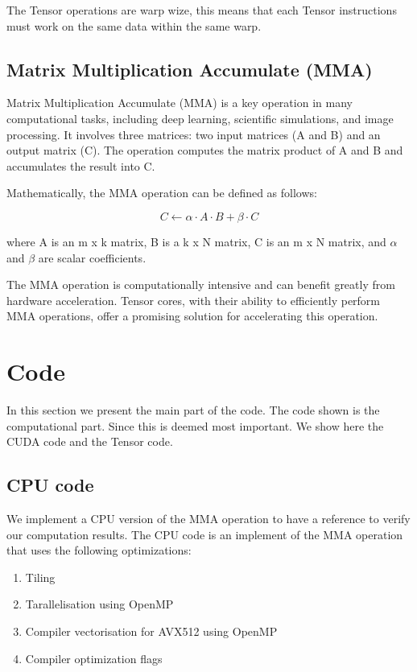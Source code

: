 \documentclass[conference]{IEEEtran}
\begin{document}
  The Tensor operations are warp wize, this means that each Tensor instructions must work on the same 
  data within the same warp.
  
  \subsection{Matrix Multiplication Accumulate (MMA)}\label{sec:mma}
  
  Matrix Multiplication Accumulate (MMA) is a key operation in many computational tasks, including deep 
  learning, scientific simulations, and image processing. It involves three matrices: two input matrices 
  (A and B) and an output matrix (C). The operation computes the matrix product of A and B and accumulates 
  the result into C.
  
  Mathematically, the MMA operation can be defined as follows:
  
  \[ C \leftarrow \alpha \cdot A \cdot B + \beta \cdot C \]
  
  where A is an m x k matrix, B is a k x N matrix, C is an m x N matrix, and $\alpha$ and $\beta$ are scalar coefficients.
  
  The MMA operation is computationally intensive and can benefit greatly from hardware acceleration. 
  Tensor cores, with their ability to efficiently perform MMA operations, offer a promising solution 
  for accelerating this operation.
  
  
  \section{Code}
  In this section we present the main part of the code. The code shown is the computational part. Since this is
  deemed most important. We show here the CUDA code and the Tensor code.

  \subsection{CPU code}\label{sec:CPUCode}
  We implement a CPU version of the MMA operation to have a reference to verify our computation results.
  The CPU code is an implement of the MMA operation that uses the following optimizations:
  \begin{enumerate}
    \item Tiling
    \item Tarallelisation using OpenMP
    \item Compiler vectorisation for AVX512 using OpenMP
    \item Compiler optimization flags
  \end{enumerate}
\end{document}
